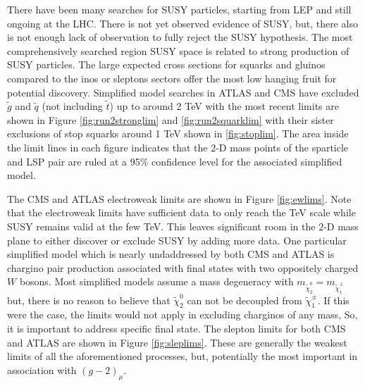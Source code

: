 There have been many searches for SUSY particles, starting from  LEP and still ongoing at the LHC. There is not yet observed evidence of SUSY, but, there also is not enough lack of observation to fully reject the SUSY hypothesis. The most comprehensively searched region SUSY space is related to strong production of SUSY particles. The large expected cross sections for squarks and gluinos compared to the inos or sleptons sectors offer the most low hanging fruit for potential discovery.
Simplified model searches in ATLAS and CMS have excluded $\tilde{g}$ and $\tilde{q}$ (not including $\tilde{t}$) up to around 2 TeV with the most recent limits are shown in Figure \ref{fig:run2stronglim} and \ref{fig:run2squarklim} with their sister exclusions of stop squarks around 1 TeV shown in \ref{fig:stoplim}. The area inside the limit lines in each figure indicates that the 2-D mass points of the sparticle and LSP pair are ruled at a 95\% confidence level for the associated simplified model.



The CMS and ATLAS electroweak limits are shown in Figure \ref{fig:ewlims}. Note that the electroweak limits have sufficient data to only reach the TeV scale while SUSY remains valid at the few TeV. This leaves significant room in the 2-D mass plane to either discover or exclude SUSY by adding more data. One particular simplified model which is nearly undaddressed by both CMS and ATLAS is chargino pair production associated with final states with two oppositely charged $W$ bosons.  Most simplified models assume a mass degeneracy with $m_{\tilde{\chi}^0_2} = m_{\tilde{\chi}^\pm_1}$ but, there is no reason to believe that $\tilde{\chi}^0_2$ can not be decoupled from $\tilde{\chi}^\pm_1$. If this were the case, the limits would not apply in excluding charginos of any mass, So, it is important to address specific final state. The slepton limits  for both CMS and ATLAS are shown in Figure \ref{fig:sleplims}. These are generally the weakest limits of all the aforementioned processes, but, potentially the most important in association with $(g-2)_\mu$.



